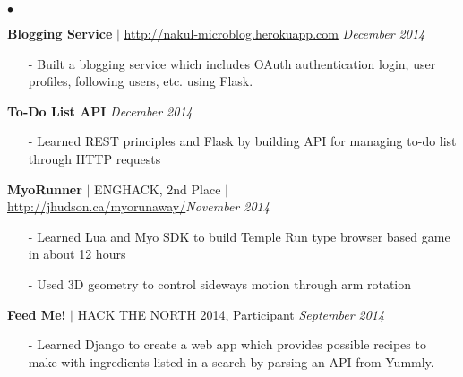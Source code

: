 \documentclass[10pt]{article}
\newenvironment{achievements}{\begin{list}{$\bullet$}{\topsep 0pt \itemsep -1.5pt \leftmargin 5pt}}{\vspace*{4pt}\end{list}}
\begin{document}
\begin{achievements}
\begin{itemize}
\end{itemize}
\vspace{2pt}
\item \textbf{Blogging Service} $|$ \url{http://nakul-microblog.herokuapp.com} \hfill \textit {December 2014}
\begin{itemize}
\item[-]Built a blogging service which includes OAuth authentication login, user profiles, following users, etc. using Flask.
\end{itemize}
\vspace{2pt}
\item \textbf{To-Do List API}  \hfill \textit {December 2014}
\begin{itemize}
\item[-]Learned REST principles and Flask by building API for managing to-do list through HTTP requests
\end{itemize}
\vspace{2pt}
\item\textbf{MyoRunner}  {$|$ \scriptsize ENGHACK, 2nd Place $|$ }  \url{http://jhudson.ca/myorunaway/}\hfill \textit {November 2014}
\begin{itemize}
\item[-]Learned Lua and Myo SDK to build Temple Run type browser based game in about 12 hours
\item[-]Used 3D geometry to control sideways motion through arm rotation
\end{itemize}
\vspace{2pt}
\item \textbf{Feed Me!} {$|$ \scriptsize HACK THE NORTH 2014, Participant}  \hfill \textit {September 2014}
\begin{itemize}
\item[-]Learned Django to create a web app which provides possible recipes to make with ingredients listed in a search by parsing an API from Yummly.
\end{itemize}
\end{achievements}

\vspace{6pt}
\end{document}
